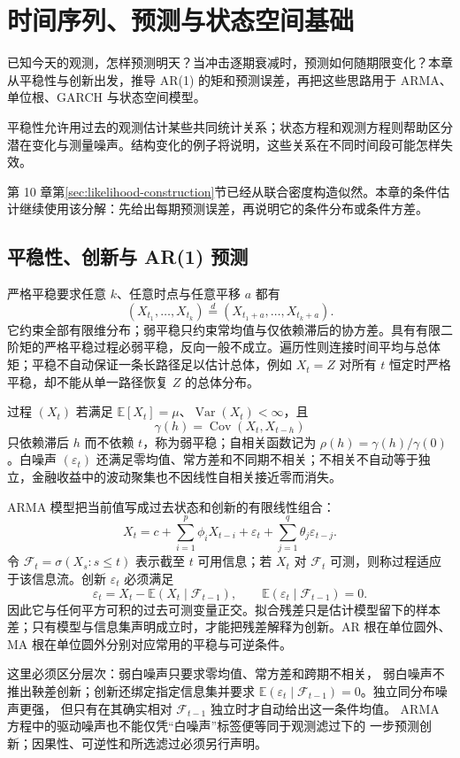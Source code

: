 \chapter{时间序列、预测与状态空间基础}
\label{ch:time-series}

已知今天的观测，怎样预测明天？当冲击逐期衰减时，预测如何随期限变化？本章从平稳性与创新出发，推导 AR(1) 的矩和预测误差，再把这些思路用于 ARMA、单位根、GARCH 与状态空间模型。

平稳性允许用过去的观测估计某些共同统计关系；状态方程和观测方程则帮助区分潜在变化与测量噪声。结构变化的例子将说明，这些关系在不同时间段可能怎样失效。

第 10 章第\ref{sec:likelihood-construction}节已经从联合密度构造似然。本章的条件估计继续使用该分解：先给出每期预测误差，再说明它的条件分布或条件方差。

\section{平稳性、创新与 AR(1) 预测}

严格平稳要求任意 $k$、任意时点与任意平移 $a$ 都有
\[
(X_{t_1},\ldots,X_{t_k})\overset d=(X_{t_1+a},\ldots,X_{t_k+a}).
\]
它约束全部有限维分布；弱平稳只约束常均值与仅依赖滞后的协方差。具有有限二阶矩的严格平稳过程必弱平稳，反向一般不成立。遍历性则连接时间平均与总体矩；平稳不自动保证一条长路径足以估计总体，例如 $X_t=Z$ 对所有 $t$ 恒定时严格平稳，却不能从单一路径恢复 $Z$ 的总体分布。

过程 $(X_t)$ 若满足 $\mathbb E[X_t]=\mu$、$\operatorname{Var}(X_t)<\infty$，且
\[
  \gamma(h)=\operatorname{Cov}(X_t,X_{t-h})
\]
只依赖滞后 $h$ 而不依赖 $t$，称为弱平稳；自相关函数记为 $\rho(h)=\gamma(h)/\gamma(0)$。白噪声 $(\varepsilon_t)$ 还满足零均值、常方差和不同期不相关；不相关不自动等于独立，金融收益中的波动聚集也不因线性自相关接近零而消失。

ARMA 模型把当前值写成过去状态和创新的有限线性组合：
\[
  X_t=c+\sum_{i=1}^{p}\phi_iX_{t-i}
      +\varepsilon_t+\sum_{j=1}^{q}\theta_j\varepsilon_{t-j}.
\]
令 $\mathcal F_t=\sigma(X_s:s\le t)$ 表示截至 $t$ 可用信息；若 $X_t$ 对 $\mathcal F_t$ 可测，则称过程适应于该信息流。创新 $\varepsilon_t$ 必须满足
\[
\varepsilon_t=X_t-\mathbb E(X_t\mid\mathcal F_{t-1}),\qquad
\mathbb E(\varepsilon_t\mid\mathcal F_{t-1})=0.
\]
因此它与任何平方可积的过去可测变量正交。拟合残差只是估计模型留下的样本差；只有模型与信息集声明成立时，才能把残差解释为创新。AR 根在单位圆外、MA 根在单位圆外分别对应常用的平稳与可逆条件。

这里必须区分层次：弱白噪声只要求零均值、常方差和跨期不相关，
弱白噪声不推出鞅差创新；创新还绑定指定信息集并要求
$\mathbb E(\varepsilon_t\mid\mathcal F_{t-1})=0$。独立同分布噪声更强，
但只有在其确实相对 $\mathcal F_{t-1}$ 独立时才自动给出这一条件均值。
ARMA 方程中的驱动噪声也不能仅凭“白噪声”标签便等同于观测滤过下的
一步预测创新；因果性、可逆性和所选滤过必须另行声明。

